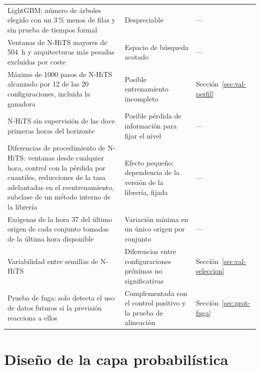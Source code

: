{\begin{xltabular}{\textwidth}{>{\raggedright\arraybackslash}p{5cm} >{\raggedright\arraybackslash}X >{\raggedright\arraybackslash}p{2.6cm}}
		LightGBM: número de árboles elegido con un 3\,\% menos de filas y sin prueba de tiempos formal & Despreciable & --- \\
		Ventanas de N-HiTS mayores de 504~h y arquitecturas más pesadas excluidas por coste & Espacio de búsqueda acotado & --- \\
		Máximo de 1000 pasos de N-HiTS alcanzado por 12 de las 20 configuraciones, incluida la ganadora & Posible entrenamiento incompleto & Sección~\ref{sec:val-perfil} \\
		N-HiTS sin supervisión de las doce primeras horas del horizonte & Posible pérdida de información para fijar el nivel & --- \\
		Diferencias de procedimiento de N-HiTS: ventanas desde cualquier hora, control con la pérdida por cuantiles, reducciones de la tasa adelantadas en el reentrenamiento, subclase de un método interno de la librería & Efecto pequeño; dependencia de la versión de la librería, fijada & --- \\
		Exógenas de la hora 37 del último origen de cada conjunto tomadas de la última hora disponible & Variación mínima en un único origen por conjunto & --- \\
		Variabilidad entre semillas de N-HiTS & Diferencias entre configuraciones próximas no significativas & Sección~\ref{sec:val-seleccion} \\
		Prueba de fuga: solo detecta el uso de datos futuros si la previsión reacciona a ellos & Complementada con el control positivo y la prueba de alineación & Sección~\ref{sec:prot-fuga} \\
\end{xltabular}
}

\FloatBarrier
\section{Diseño de la capa probabilística}\label{sec:probabilistica}

